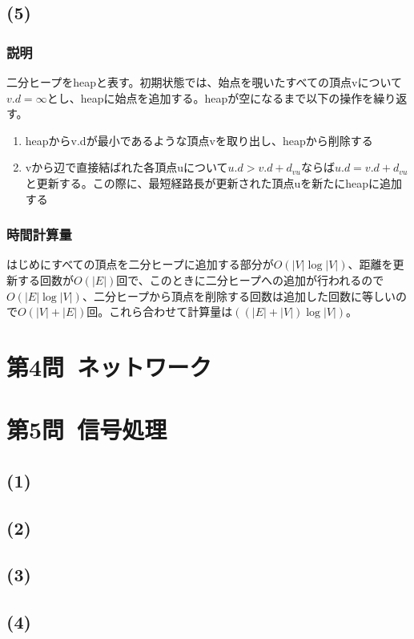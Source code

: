 \documentclass[a4paper,12pt,xelatex,ja=standard]{bxjsarticle}
\begin{document}
\subsection*{(5)}
\subsubsection*{説明}
二分ヒープをheapと表す。初期状態では、始点を覗いたすべての頂点vについて$v.d = \infty$とし、heapに始点を追加する。heapが空になるまで以下の操作を繰り返す。

\begin{enumerate}
  \item heapからv.dが最小であるような頂点vを取り出し、heapから削除する
  \item vから辺で直接結ばれた各頂点uについて$u.d > v.d + d_{vu}$ならば$u.d = v.d + d_{vu}$と更新する。この際に、最短経路長が更新された頂点uを新たにheapに追加する
\end{enumerate}

\subsubsection*{時間計算量}
はじめにすべての頂点を二分ヒープに追加する部分が$O(|V| \log |V|)$、距離を更新する回数が$O(|E|)$回で、このときに二分ヒープへの追加が行われるので$O(|E| \log |V|)$、二分ヒープから頂点を削除する回数は追加した回数に等しいので$O(|V| + |E|)$回。これら合わせて計算量は$((|E| + |V|) \log |V|)$。

\section*{第4問\ ネットワーク}

\section*{第5問\ 信号処理}
\subsection*{(1)}
\subsection*{(2)}
\subsection*{(3)}
\subsection*{(4)}
\end{document}
